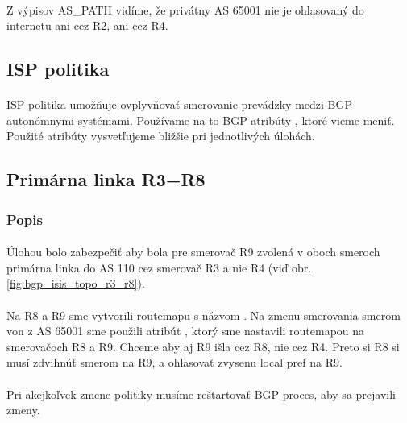 \documentclass[12pt,twoside,a4paper]{report}
\begin{document}
\paragraph{}
Z výpisov AS\_PATH vidíme, že privátny AS 65001 nie je ohlasovaný do internetu ani cez R2, ani cez R4.








\newpage

\subsection{ISP politika}
\paragraph{}
ISP politika umožňuje ovplyvňovať smerovanie prevádzky medzi BGP autonómnymi systémami. Používame na to BGP atribúty , ktoré vieme meniť. Použité atribúty vysvetľujeme bližšie pri jednotlivých úlohách.

\subsection{Primárna linka R3−R8}
\subsubsection{Popis}
\paragraph{}
Úlohou bolo zabezpečiť aby bola pre smerovač R9 zvolená v oboch smeroch primárna linka do AS 110 cez smerovač R3 a nie R4 (viď obr. \ref{fig:bgp_isis_topo_r3_r8}). 

\paragraph{}
Na R8 a R9 sme vytvorili routemapu s názvom . Na zmenu smerovania smerom von z AS 65001 sme použili atribút , ktorý sme nastavili routemapou na smerovačoch R8 a R9. Chceme aby aj R9 išla cez R8, nie cez R4. Preto si R8 si musí zdvihnúť  smerom na R9, a ohlasovať zvysenu local pref na R9.

\paragraph{}
Pri akejkoľvek zmene politiky musíme reštartovať BGP proces, aby sa prejavili zmeny.
\end{document}
